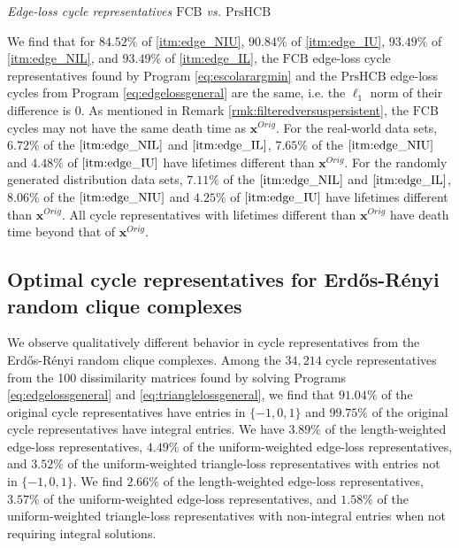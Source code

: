 \documentclass[11pt,onecolumn]{article}
\newcommand{\originalrep}{\mathbf{x}^{Orig}}
\newcommand{\setoffilteredcyclebases}{\mathrm{FCB}}
\newcommand{\setofpersistenthcyclebases}{\mathrm{PrsHCB}}
\newcommand{\pr}{Program }
\theoremstyle{plain}
\theoremstyle{definition}
\begin{document}
\vspace{.1in}
 \noindent \emph{Edge-loss cycle representatives $\setoffilteredcyclebases$ vs. $\setofpersistenthcyclebases$}

We find that for $84.52\%$ of \ref{itm:edge_NIU}, $90.84\%$ of \ref{itm:edge_IU}, $93.49\%$ of \ref{itm:edge_NIL}, and $93.49\%$ of \ref{itm:edge_IL}, the $\setoffilteredcyclebases$ edge-loss cycle representatives found by \pr \eqref{eq:escolarargmin} and the $\setofpersistenthcyclebases$ edge-loss cycles from \pr \eqref{eq:edgelossgeneral} are the same, i.e. the $\ell_1$ norm of their difference is $0$. As mentioned in Remark \ref{rmk:filteredversuspersistent}, the $\setoffilteredcyclebases$ cycles may not have the same death time as $\originalrep$. For the real-world data sets, $6.72\%$ of the $\eqref{itm:edge_NIL}$ and $\eqref{itm:edge_IL}$,  $7.65\%$ of the $\eqref{itm:edge_NIU}$ and $4.48\%$ of $\eqref{itm:edge_IU}$ have lifetimes different than $\originalrep$. For the randomly generated distribution data sets, $7.11\%$ of the $\eqref{itm:edge_NIL}$ and $\eqref{itm:edge_IL}$,  $8.06\%$ of the $\eqref{itm:edge_NIU}$ and $4.25\%$ of $\eqref{itm:edge_IU}$ have lifetimes different than $\originalrep$. All cycle representatives with lifetimes different than $\originalrep$ have death time beyond that of $\originalrep$.



\subsection{Optimal cycle representatives for Erd\H{o}s-R\'enyi random clique complexes}
\label{sec:erdosbehavior}

We observe qualitatively different behavior in cycle representatives from the Erd\H{o}s-R\'enyi random clique complexes.
Among the $34{,}214$ cycle representatives from the 100 dissimilarity matrices found by solving Programs \eqref{eq:edgelossgeneral} and \eqref{eq:trianglelossgeneral}, we find that $91.04\%$ of the original cycle representatives have entries in $\{-1,0,1\}$ and $99.75\%$ of the original cycle representatives have integral entries. We have $3.89\%$ of the length-weighted edge-loss representatives, $4.49\%$ of the uniform-weighted edge-loss representatives, and $3.52\%$ of the uniform-weighted triangle-loss representatives with entries not in $\{-1,0,1\}$. We find $2.66\%$ of the length-weighted edge-loss representatives, $3.57\%$ of the uniform-weighted edge-loss representatives, and $1.58\%$ of the uniform-weighted triangle-loss representatives with non-integral entries when not requiring integral solutions.
\end{document}
